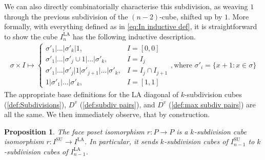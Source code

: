 \documentclass{amsart}
\newtheorem{proposition}[theorem]{Proposition}
\theoremstyle{definition}
\newcommand{\SU}{\mathrm{SU}}
\newcommand{\LA}{\mathrm{LA}}
\newcommand{\subdivpairsv}{D^v}
\newcommand{\maxsubdivpairsv}{\overline{D^v}}
\begin{document}
We can also directly combinatorially characterise this subdivision, as  weaving $1$ through the previous subdivision of the $(n-2)$-cube, shifted up by $1$.
More formally, with everything defined as in \cref{eq:In inductive def}, it is straightforward to show the cube $I_{n}^{\LA}$ has the following inductive description.
\begin{align} \label{eq:In LA inductive def}
    \sigma \times I \mapsto 
    \begin{cases}
        \sigma'_1|...|\sigma'_k| 1, &I = [0, 0]\\
        \sigma'_1|...|\sigma'_j \cup 1|...|\sigma'_k, &I = I_j\\
        \sigma'_1|...|\sigma'_j|1|\sigma'_{j+1}|...|\sigma'_k, &I = I_j \cap I_{j+1}\\
        1|\sigma'_1|...|\sigma'_k, &I = [1, 1]
    \end{cases}
    , \text{where } \sigma'_i = \{x+1:x\in \sigma\}
\end{align}
The appropriate base definitions for the $\LA$ diagonal of $k$-subdivision cubes (\ref{def:Subdivisions}),  ${\subdivpairsv}$ (\ref{def:subdiv pairs}), and $\maxsubdivpairsv$ (\ref{def:max subdiv pairs}) are all the same.
We then immediately observe, that by construction.
\begin{proposition}
The face poset isomorphism $r: P\to P$ is a $k$-subdivision cube isomorphism $r:I^{\SU}\to I^{\LA}$. In particular, it sends $k$-subdivision cubes of $I^{\SU}_{n-1}$ to $k$-subdivision cubes of $I^{\LA}_{n-1}$.
\end{proposition}
\end{document}
